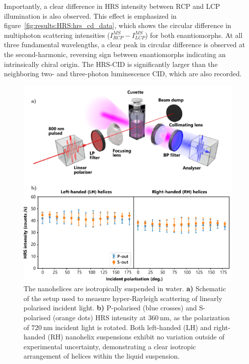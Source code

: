 Importantly, a clear difference in HRS intensity between RCP and LCP illumination is also observed. 
This effect is emphasized in figure~\ref{fig:results:HRS:hrs_cd_data}, which shows the circular difference in multiphoton scattering intensities ($I_{RCP}^{MS}-I_{LCP}^{MS}$) for both enantiomorphs. At all three fundamental wavelengths, a clear peak in circular difference is observed at the second-harmonic, reversing sign between enantiomorphs indicating an intrinsically chiral origin. The HRS-CID is significantly larger than the neighboring two- and three-photon luminescence CID, which are also recorded. 

\begin{figure}[htb!]	
    \centering	
    \includegraphics[scale=1]{./figures/results/HRS/hrs_linpol_data.pdf}
    \caption{\label{fig:results:HRS:hrs_linpol_data}
    The nanohelices are isotropically suspended in water. \textbf{a)} Schematic of the setup used to measure hyper-Rayleigh scattering of linearly polarised incident light. \textbf{b)} P-polarised (blue crosses) and S-polarised (orange dots) HRS intensity at $\SI{360}{\nano\m}$, as the polarization of $\SI{720}{\nano\m}$ incident light is rotated. Both left-handed (LH) and right-handed (RH) nanohelix suspensions exhibit no variation outside of experimental uncertainty, demonstrating a clear isotropic arrangement of helices within the liquid suspension.}	
\end{figure}

